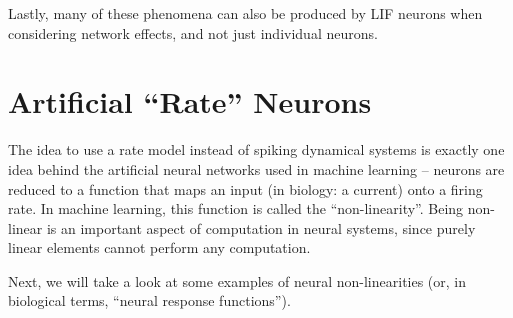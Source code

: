 \documentclass[10pt,letterpaper,oneside]{article}
\begin{document}
Lastly, many of these phenomena can also be produced by LIF neurons when considering network effects, and not just individual neurons.


\section{Artificial \enquote{Rate} Neurons}

The idea to use a rate model instead of spiking dynamical systems is exactly one idea behind the artificial neural networks used in machine learning -- neurons are reduced to a function that maps an input (in biology: a current) onto a firing rate. In machine learning, this function is called the \enquote{non-linearity}. Being non-linear is an important aspect of computation in neural systems, since purely linear elements cannot perform any computation.


Next, we will take a look at some examples of neural non-linearities (or, in biological terms, \enquote{neural response functions}).



\end{document}
